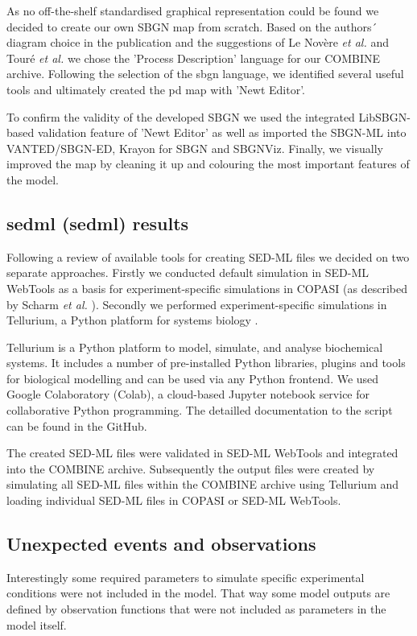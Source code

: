 As no off-the-shelf standardised graphical representation could be found we decided to create our own SBGN map from scratch. Based on the authors´ diagram choice in the publication and the suggestions of Le Novère \textit{et al.} \cite{sbgnnovere} and Touré \textit{et al.} \cite{sbgntoure} we chose the 'Process Description' language for our COMBINE archive. Following the selection of the \ac{sbgn} language, we identified several useful tools and ultimately created the \ac{pd} map with 'Newt Editor'. 

To confirm the validity of the developed SBGN we used the integrated LibSBGN-based validation feature of 'Newt Editor' as well as imported the SBGN-ML into VANTED/SBGN-ED, Krayon for SBGN and SBGNViz. Finally, we visually improved the map by cleaning it up and colouring the most important features of the model.

\subsection*{\acl{sedml} (\ac{sedml}) results}

Following a review of available tools for creating SED-ML files \cite{org.12.08.2021} we decided on two separate approaches. Firstly we conducted default simulation in SED-ML WebTools as a basis for experiment-specific simulations in COPASI (as described by Scharm \textit{et al.} \cite{combine}). Secondly we performed experiment-specific simulations in Tellurium, a Python platform for systems biology \cite{tellurium}.

Tellurium is a Python platform to model, simulate, and analyse biochemical systems. It includes a number of pre-installed Python libraries, plugins and tools for biological modelling and can be used via any Python frontend. We used Google Colaboratory (Colab), a cloud-based Jupyter notebook service for collaborative Python programming. The detailled documentation to the script can be found in the GitHub.

The created SED-ML files were validated in SED-ML WebTools and integrated into the COMBINE archive. Subsequently the output files were created by simulating all SED-ML files within the COMBINE archive using Tellurium and loading individual SED-ML files in COPASI or SED-ML WebTools. 

\subsection*{Unexpected events and observations}
Interestingly some required parameters to simulate specific experimental conditions were not included in the model. That way some model outputs are defined by observation functions that were not included as parameters in the model itself. 

